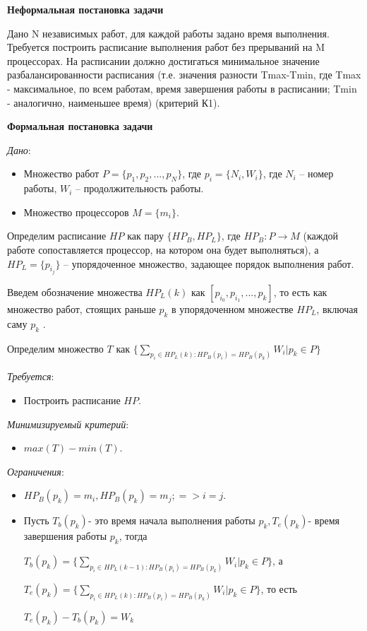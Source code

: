 \documentclass{article}
\begin{document}
\textbf{Неформальная постановка задачи}

Дано N независимых работ, для каждой работы задано время выполнения. Требуется построить расписание выполнения работ без прерываний на M процессорах. На расписании должно достигаться минимальное значение разбалансированности расписания (т.е. значения разности Tmax-Tmin, где Tmax - максимальное, по всем работам, время завершения работы в расписании; Tmin - аналогично, наименьшее время) (критерий К1).

\textbf{Формальная постановка задачи}

\textit{Дано}:
\begin{itemize}
\item Множество работ $P = \{p_1, p_2, ..., p_N\}$, где $p_i = \{N_i, W_i\}$, где $N_i$ -- номер работы, $W_i$ -- продолжительность работы.
\item Множество процессоров $M = \{m_i\}$.
\end{itemize}

Определим расписание $HP$ как пару $\{HP_B, HP_L\}$, где $HP_B: P \rightarrow M$ (каждой работе сопоставляется процессор, на котором она будет выполняться), а $HP_L = \{p_{i_j}\}$ -- упорядоченное множество, задающее порядок выполнения работ.

Введем обозначение множества $HP_L(k)$ как $[p_{i_0}, p_{i_1}, ..., p_k]$, то есть как множество работ, стоящих раньше $p_k$ в упорядоченном множестве $HP_L$, включая саму $p_k$ .

Определим множество $T$ как $\{\sum\limits_{p_i\in HP_L(k):HP_B(p_i) = HP_B(p_k)} W_i | p_k\in P\}$

\textit{Требуется}:
\begin{itemize}
\item Построить расписание $HP$.
\end{itemize}



\textit{Минимизируемый критерий}:
\begin{itemize}
\item $max(T) - min(T)$.
\end{itemize}

\textit{Ограничения}:
\begin{itemize}
\item $HP_B(p_k) = m_i,HP_B(p_k) = m_j;=> i = j.$
\item  Пусть $T_b(p_k)$- это время начала выполнения работы $p_k, T_e(p_k)$- время завершения работы $p_k$, тогда

$T_b(p_k)=\{\sum\limits_{p_i\in HP_L(k-1):HP_B(p_i) = HP_B(p_k)} W_i | p_k\in P\}$, а

$T_e(p_k)=\{\sum\limits_{p_i\in HP_L(k):HP_B(p_i) = HP_B(p_k)} W_i | p_k\in P\}$, то есть

$T_e(p_k)-T_b(p_k)=W_k$
\end{itemize}
\end{document}
